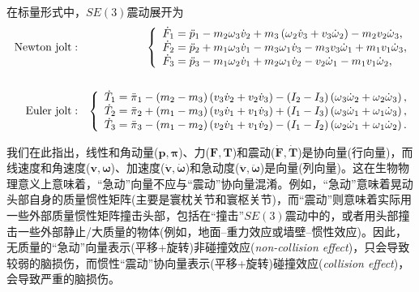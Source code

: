 \documentclass[11pt,fontset=founder]{ctexart}
\begin{document}
在标量形式中，$SE(3)$震动展开为
\begin{eqnarray*}
\text{Newton~jolt} &:&\left\{
\begin{array}{l}
\dot{F}_{{1}}=\ddot{p}_{1}-m_{{2}}\omega _{{3}}\dot{v}_{{2}}+m_{{3}}\left( {%
\omega }_{{2}}\dot{v}_{{3}}+v_{{3}}\dot{\omega}_{{2}}\right) -m_{{2}}v_{{2}}{%
\dot{\omega}}_{{3}}, \\
\dot{F}_{{2}}=\ddot{p}_{2}+m_{{1}}\omega _{{3}}\dot{v}_{{1}}-m_{{3}}\omega _{%
{1}}\dot{v}_{{3}}-m_{{3}}v_{{3}}\dot{\omega}_{{1}}+m_{{1}}v_{{1}}\dot{\omega}%
_{{3}}, \\
\dot{F}_{{3}}=\ddot{p}_{3}-m_{{1}}\omega _{{2}}\dot{v}_{{1}}+m_{{2}}\omega _{%
{1}}\dot{v}_{{2}}-v_{{2}}\dot{\omega}_{{1}}-m_{{1}}v_{{1}}\dot{\omega}_{{2}},
\end{array}
\right. \\
&& \\
\text{Euler~jolt} &:&\left\{
\begin{array}{l}
\dot{T}_{{1}}=\ddot{\pi}_{1}-(m_{{2}}-m_{{3}})\left( v_{{3}}\dot{v}_{{2}}+v_{%
{2}}\dot{v}_{{3}}\right) -(I_{{2}}-I_{{3}})\left( \omega _{{3}}\dot{\omega}_{%
{2}}+{\omega }_{{2}}{\dot{\omega}}_{{3}}\right) , \\
\dot{T}_{{2}}=\ddot{\pi}_{2}+(m_{{1}}-m_{{3}})\left( v_{{3}}\dot{v}_{{1}}+v_{%
{1}}\dot{v}_{{3}}\right) +(I_{{1}}-I_{{3}})\left( {\omega }_{{3}}{\dot{\omega%
}}_{{1}}+{\omega }_{{1}}{\dot{\omega}}_{{3}}\right) , \\
\dot{T}_{{3}}=\ddot{\pi}_{3}-(m_{{1}}-m_{{2}})\left( v_{{2}}\dot{v}_{{1}}+v_{%
{1}}\dot{v}_{{2}}\right) -(I_{{1}}-I_{{2}})\left( {\omega }_{{2}}{\dot{\omega%
}}_{{1}}+{\omega }_{{1}}{\dot{\omega}}_{{2}}\right).
\end{array}
\right.
\end{eqnarray*}

我们在此指出，线性和角动量($\mathbf{p,\pi }$)、力($\mathbf{F,T}$)和震动($\boldsymbol{\dot{\mathbf F},\dot{\mathbf T}}$)是协向量(行向量)，而线速度和角速度($\mathbf{ v,\omega }$)、加速度($\boldsymbol{\dot{\mathbf v},\dot{\omega}}$)和急动度($ \boldsymbol{\ddot{\mathbf v},\ddot{\omega}}$)是向量(列向量)。这在生物物理意义上意味着，“急动”向量不应与“震动”协向量混淆。例如，“急动”意味着晃动头部自身的质量惯性矩阵(主要是寰枕关节和寰枢关节)，而“震动”则意味着实际用一些外部质量惯性矩阵撞击头部，包括在“撞击”$SE(3)$震动中的，或者用头部撞击一些外部静止/大质量的物体(例如，地面–重力效应或墙壁–惯性效应)。因此，无质量的“急动”向量表示(平移+旋转)非碰撞效应(\textit{non-collision effect})，只会导致较弱的脑损伤，而惯性“震动”协向量表示(平移+旋转)碰撞效应(\textit{collision effect})，会导致严重的脑损伤。
\end{document}
